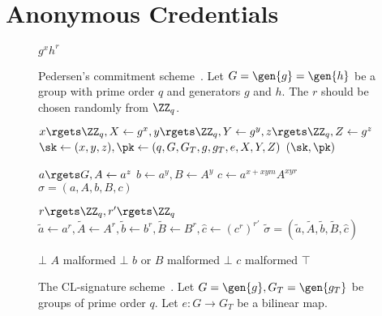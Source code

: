 \section{Anonymous Credentials}
\begin{figure}
  \small
  \begin{algorithmic}
    \State \Return $g^x h^r$
    \EndFunction
  \end{algorithmic}
  \caption{\label{ACcommitAlg}%
    Pedersen's commitment scheme~\cite{PedersenCommitment}.
    Let \(G = \gen{g} = \gen{h}\) be a group with prime order \(q\) and 
    generators \(g\) and \(h\).%
    The \(r\) should be chosen randomly from \(\ZZ_q\).
  }
\end{figure}

\begin{figure}
  \small
  \begin{algorithmic}
    \Function{\CLsetup}{}
    \State $x\rgets \ZZ_q, X\gets g^x, y\rgets \ZZ_q, Y\gets g^y, z\rgets 
    \ZZ_q, Z\gets g^z$
    \State $\sk\gets (x,y,z), \pk\gets (q, G, G_T, g, g_T, e, X, Y, Z)$
    \State \Return $(\sk, \pk)$
    \EndFunction

    \State $a\rgets G, A\gets a^z$
    \State $b\gets a^y, B\gets A^y$
    \State $c\gets a^{x+xym} A^{xyr}$
    \State \Return $\sigma = (a, A, b, B, c)$
    \EndFunction

    \State $r\rgets \ZZ_q, r'\rgets \ZZ_q$
    \State $\tilde a\gets a^r, \tilde A\gets A^r,
      \tilde b\gets b^r, \tilde B\gets B^r,
      \hat c\gets (c^r)^{r'}$
    \State \Return $\tilde \sigma = (\tilde a, \tilde A,
      \tilde b, \tilde B, \hat c)$
    \EndFunction

    \State \Return $\bot$
    \Comment $A$ malformed
    \State \Return $\bot$
    \Comment $b$ or $B$ malformed
    \State \Return $\bot$
    \Comment $c$ malformed
    \EndIf
    \State \Return $\top$
    \EndFunction

  \end{algorithmic}
  \caption{\label{ACsignAlg}%
    The CL-signature scheme~\cite{CLsignatures}.
    Let \(G = \gen{g}, G_T = \gen{g_T}\) be groups of prime order \(q\).
    Let \(e\colon G\to G_T\) be a bilinear map.
  }
\end{figure}

